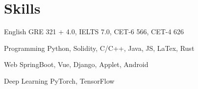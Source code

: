 \documentclass[12pt,letterpaper]{report}
\begin{document}
    \section*{Skills}
    \begin{tablist}
        \item[English] \tab{}\tab{}GRE 321 + 4.0, IELTS 7.0, CET-6 566, CET-4 626
        \item[Programming] \tab{}Python, Solidity, C/C++, Java, JS, LaTex, Rust
        \item[Web] \tab{}\tab{}SpringBoot, Vue, Django, Applet, Android
        \item[Deep Learning] \tab{}PyTorch, TensorFlow
    \end{tablist}
\end{document}
